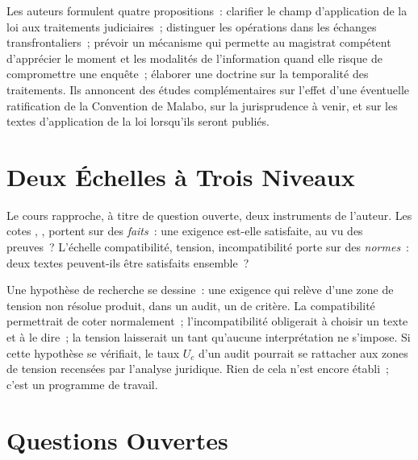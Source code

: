 Les auteurs formulent quatre propositions~: clarifier le champ
d'application de la loi aux traitements judiciaires~; distinguer les
opérations dans les échanges transfrontaliers~; prévoir un mécanisme qui
permette au magistrat compétent d'apprécier le moment et les modalités de
l'information quand elle risque de compromettre une enquête~; élaborer une
doctrine sur la temporalité des traitements. Ils annoncent des études
complémentaires sur l'effet d'une éventuelle ratification de la Convention
de Malabo, sur la jurisprudence à venir, et sur les textes d'application de
la loi lorsqu'ils seront publiés.

\section{Deux Échelles à Trois Niveaux}
\label{sec:c16-echelles}

Le cours rapproche, à titre de question ouverte, deux instruments de
l'auteur. Les cotes \OUI{}, \NON{}, \NEK{} portent sur des \textit{faits}~:
une exigence est-elle satisfaite, au vu des preuves~? L'échelle
compatibilité, tension, incompatibilité porte sur des \textit{normes}~:
deux textes peuvent-ils être satisfaits ensemble~?

Une hypothèse de recherche se dessine~: une exigence qui relève d'une zone
de tension non résolue produit, dans un audit, un \NEK{} de critère. La
compatibilité permettrait de coter normalement~; l'incompatibilité
obligerait à choisir un texte et à le dire~; la tension laisserait un
\NEK{} tant qu'aucune interprétation ne s'impose. Si cette hypothèse se
vérifiait, le taux $U_c$ d'un audit pourrait se rattacher aux zones de
tension recensées par l'analyse juridique. Rien de cela n'est encore
établi~; c'est un programme de travail.

\section{Questions Ouvertes}
\label{sec:c16-questions}

